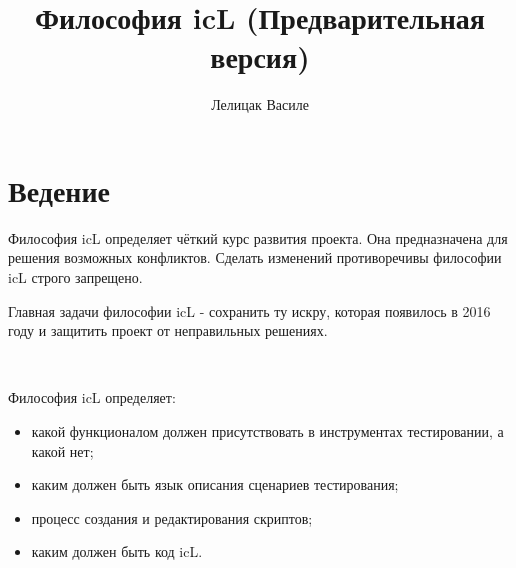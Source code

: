 \documentclass[a4paper, 14pt]{extarticle}
\newenvironment{icItems}
{ \begin{itemize} [noitemsep,nolistsep] }
	{ \end{itemize} }
\begin{document}
\title{Философия icL (Предварительная версия)}
\author{Лелицак Василе}

\maketitle 

\pagebreak
\tableofcontents

\pagebreak
\section{Ведение}

Философия icL определяет чёткий курс развития проекта. Она предназначена для решения возможных конфликтов. Сделать изменений противоречивы философии icL строго запрещено. 

Главная задачи философии icL - сохранить ту искру, которая появилось в 2016 году и защитить проект от неправильных решениях.

\

Философия icL определяет:
\begin{icItems}
	\item какой функционалом должен присутствовать в инструментах тестировании, а какой нет;
	\item каким должен быть язык описания сценариев тестирования;
	\item процесс создания и редактирования скриптов;
	\item каким должен быть код icL.
\end{icItems}





\end{document}
